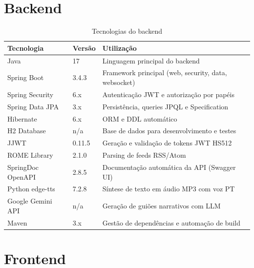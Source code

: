 \documentclass[12pt, a4paper]{report}
\begin{document}
\section{Backend}

\begin{table}[H]
  \centering
  \begin{tabularx}{\textwidth}{L{4cm} L{2cm} X}
    \toprule
    \textbf{Tecnologia} & \textbf{Versão} & \textbf{Utilização} \\
    \midrule
    Java               & 17        & Linguagem principal do backend \\
    Spring Boot        & 3.4.3     & Framework principal (web, security, data, websocket) \\
    Spring Security    & 6.x       & Autenticação JWT e autorização por papéis \\
    Spring Data JPA    & 3.x       & Persistência, queries JPQL e Specification \\
    Hibernate          & 6.x       & ORM e DDL automático \\
    H2 Database        & n/a       & Base de dados para desenvolvimento e testes \\
    JJWT               & 0.11.5    & Geração e validação de tokens JWT HS512 \\
    ROME Library       & 2.1.0     & Parsing de feeds RSS/Atom \\
    SpringDoc OpenAPI  & 2.8.5     & Documentação automática da API (Swagger UI) \\
    Python edge-tts    & 7.2.8     & Síntese de texto em áudio MP3 com voz PT \\
    Google Gemini API  & n/a       & Geração de guiões narrativos com LLM \\
    Maven              & 3.x       & Gestão de dependências e automação de build \\
    \bottomrule
  \end{tabularx}
  \caption{Tecnologias do backend}
\end{table}

\section{Frontend}
\end{document}
